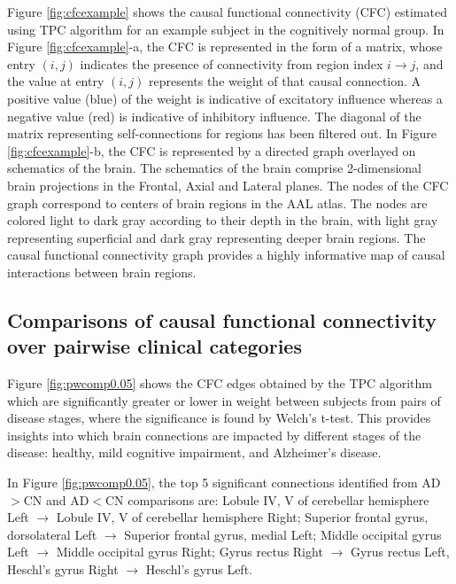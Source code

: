 \documentclass[12pt,reqno]{amsart}
\theoremstyle{definition}
\begin{document}
Figure \ref{fig:cfcexample} shows the causal functional connectivity (CFC) estimated using TPC algorithm for an example subject in the cognitively normal group. In Figure \ref{fig:cfcexample}-a, the CFC is represented in the form of a matrix, whose entry $(i,j)$ indicates the presence of connectivity from region index $i\rightarrow j$, and the value at entry $(i,j)$ represents the weight of that causal connection. A positive value (blue) of the weight is indicative of excitatory influence whereas a negative value (red) is indicative of inhibitory influence. The diagonal of the matrix representing self-connections for regions has been filtered out. In Figure \ref{fig:cfcexample}-b, the CFC is represented by a directed graph overlayed on schematics of the brain. The schematics of the brain comprise 2-dimensional brain projections in the Frontal, Axial and Lateral planes. The nodes of the CFC graph correspond to centers of brain regions in the AAL atlas. The nodes are colored light to dark gray according to their depth in the brain, with light gray representing superficial and dark gray representing deeper brain regions. The causal functional connectivity graph provides a highly informative map of causal interactions between brain regions.



\subsection{Comparisons of causal functional connectivity over pairwise clinical categories}\label{sec:cfccomp}
Figure \ref{fig:pwcomp0.05} shows the CFC edges obtained by the TPC algorithm which are significantly greater or lower in weight between subjects from pairs of disease stages, where the significance is found by Welch's t-test. This provides insights into which brain connections are impacted by different stages of the disease: healthy, mild cognitive impairment, and Alzheimer's disease. 

In Figure \ref{fig:pwcomp0.05}, the top 5 significant connections identified from AD$>$CN and AD$<$CN comparisons are: Lobule IV, V of cerebellar hemisphere Left $\rightarrow$ Lobule IV, V of cerebellar hemisphere Right; Superior frontal gyrus, dorsolateral Left $\rightarrow$ Superior frontal gyrus, medial Left; Middle occipital gyrus Left $\rightarrow$ Middle occipital gyrus Right; Gyrus rectus Right $\rightarrow$ Gyrus rectus Left, Heschl's gyrus Right $\rightarrow$ Heschl's gyrus Left.
\end{document}
